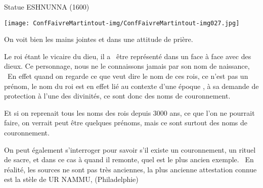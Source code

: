 \documentclass[a4paper]{article}
\begin{document}
\bigskip


\bigskip


\bigskip


\bigskip


\bigskip


\bigskip


\bigskip


\bigskip


\bigskip


\bigskip


\bigskip


\bigskip


\bigskip


\bigskip


\bigskip


\bigskip


\bigskip


\bigskip

{
Statue ESHNUNNA (1600) }


\bigskip


\texttt{[image: ConfFaivreMartintout-img/ConfFaivreMartintout-img027.jpg]}



\bigskip

{
On voit bien les mains jointes et dans une attitude de prière.}


\bigskip


\bigskip


\bigskip


\bigskip

{
Le roi étant le vicaire du dieu, il a \ être représenté dans un face à
face avec des dieux. Ce personnage, nous ne le connaissons jamais par
son nom de naissance, \ En effet quand on regarde ce que veut dire le
nom de ces rois, ce n'est pas un prénom, le nom du roi est en effet lié
au contexte d'une époque , à sa demande de protection à l'une des
divinités, ce sont donc des noms de couronnement.}

{
Et si on reprenait tous les noms des rois depuis 3000 ans, ce que l'on
ne pourrait faire, on verrait peut être quelques prénoms, mais ce sont
surtout des noms de couronnement.}


\bigskip


\bigskip


\bigskip

{
On peut également s'interroger pour savoir s'il existe un couronnement,
un rituel de sacre, et dans ce cas à quand il remonte, quel est le plus
ancien exemple. \ En réalité, les sources ne sont pas très anciennes,
la plus ancienne attestation connue est la stèle de UR NAMMU,
(Philadelphie)}
\end{document}

